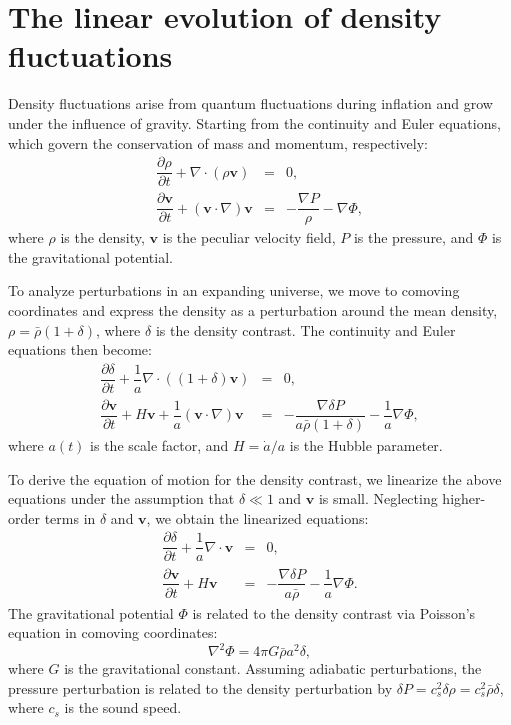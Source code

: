 \section{The linear evolution of density fluctuations}
Density fluctuations arise from quantum fluctuations during inflation and grow under the influence of gravity. 
Starting from the continuity and Euler equations, which govern the conservation of mass and momentum, respectively:
\begin{eqnarray}
    \label{eq:continuity_equation}
    \dfrac{\partial \rho}{\partial t} + \nabla \cdot (\rho \boldsymbol{v}) &=& 0, \\[2ex]
    \label{eq:euler_equation}
    \dfrac{\partial \boldsymbol{v}}{\partial t} + (\boldsymbol{v} \cdot \nabla) \boldsymbol{v} &=& -\dfrac{\nabla P}{\rho} - \nabla \Phi,
\end{eqnarray}
where \( \rho \) is the density, \( \boldsymbol{v} \) is the peculiar velocity field, \( P \) is the pressure, and \( \Phi \) is the gravitational potential.

To analyze perturbations in an expanding universe, we move to comoving coordinates and express the density as a perturbation around the mean density, \( \rho = \bar{\rho}(1 + \delta) \), where \( \delta \) is the density contrast. The continuity and Euler equations then become:
\begin{eqnarray}
    \label{eq:continuity_equation_rewritten}
    \dfrac{\partial \delta}{\partial t} + \dfrac{1}{a} \nabla \cdot \left( (1 + \delta) \boldsymbol{v} \right) &=& 0, \\[2ex]
    \label{eq:euler_equation_rewritten}
    \dfrac{\partial \boldsymbol{v}}{\partial t} + H \boldsymbol{v} + \dfrac{1}{a} (\boldsymbol{v} \cdot \nabla) \boldsymbol{v} &=& -\dfrac{\nabla \delta P}{a \bar{\rho} (1 + \delta)} - \dfrac{1}{a} \nabla \Phi,
\end{eqnarray}
where \( a(t) \) is the scale factor, and \( H = \dot{a}/a \) is the Hubble parameter.

To derive the equation of motion for the density contrast, we linearize the above equations under the assumption that \( \delta \ll 1 \) and \( \boldsymbol{v} \) is small. Neglecting higher-order terms in \( \delta \) and \( \boldsymbol{v} \), we obtain the linearized equations:
\begin{eqnarray}
    \label{eq:linear_continuity}
    \dfrac{\partial \delta}{\partial t} + \dfrac{1}{a} \nabla \cdot \boldsymbol{v} &=& 0, \\[2ex]
    \label{eq:linear_euler}
    \dfrac{\partial \boldsymbol{v}}{\partial t} + H \boldsymbol{v} &=& -\dfrac{\nabla \delta P}{a \bar{\rho}} - \dfrac{1}{a} \nabla \Phi.
\end{eqnarray}
The gravitational potential \( \Phi \) is related to the density contrast via Poisson's equation in comoving coordinates:
\begin{equation}
    \label{eq:poisson_equation}
    \nabla^2 \Phi = 4\pi G \bar{\rho} a^2 \delta,
\end{equation}
where \( G \) is the gravitational constant.
Assuming adiabatic perturbations, the pressure perturbation is related to the density perturbation by \( \delta P = c_s^2 \delta \rho = c_s^2 \bar{\rho} \delta \), where \( c_s \) is the sound speed.

